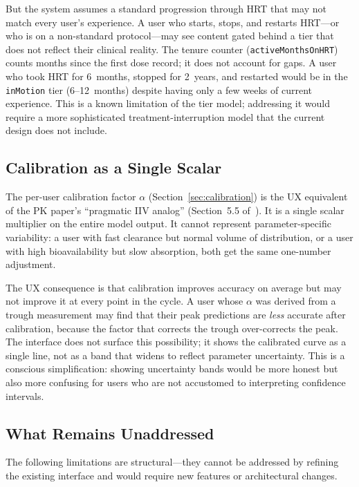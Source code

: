 \documentclass[11pt,a4paper]{article}
\newcommand{\code}[1]{\texttt{\small #1}}
\begin{document}
But the system assumes a standard progression through HRT that may not
match every user's experience. A user who starts, stops, and restarts
HRT---or who is on a non-standard protocol---may see content gated behind
a tier that does not reflect their clinical reality. The tenure counter
(\code{activeMonthsOnHRT}) counts months since the first dose record; it
does not account for gaps. A user who took HRT for 6~months, stopped for
2~years, and restarted would be in the \code{inMotion} tier (6--12~months)
despite having only a few weeks of current experience. This is a known
limitation of the tier model; addressing it would require a more
sophisticated treatment-interruption model that the current design does
not include.

\subsection{Calibration as a Single Scalar}
\label{sec:calibration_scalar}

The per-user calibration factor $\alpha$ (Section~\ref{sec:calibration})
is the UX equivalent of the PK paper's ``pragmatic IIV analog''
(Section~5.5 of~\cite{xtpk}). It is a single scalar multiplier on the
entire model output. It cannot represent parameter-specific variability: a
user with fast clearance but normal volume of distribution, or a user
with high bioavailability but slow absorption, both get the same
one-number adjustment.

The UX consequence is that calibration improves accuracy on average but
may not improve it at every point in the cycle. A user whose $\alpha$ was
derived from a trough measurement may find that their peak predictions
are \emph{less} accurate after calibration, because the factor that
corrects the trough over-corrects the peak. The interface does not
surface this possibility; it shows the calibrated curve as a single line,
not as a band that widens to reflect parameter uncertainty. This is a
conscious simplification: showing uncertainty bands would be more honest
but also more confusing for users who are not accustomed to interpreting
confidence intervals.

\subsection{What Remains Unaddressed}
\label{sec:unaddressed}

The following limitations are structural---they cannot be addressed by
refining the existing interface and would require new features or
architectural changes.
\end{document}
